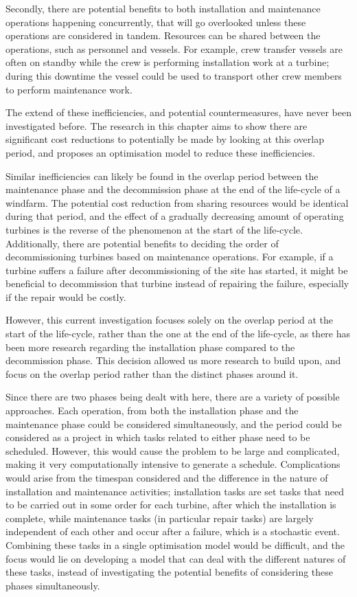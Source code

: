 \documentclass[a4paper,12pt]{report}
\begin{document}
Secondly, there are potential benefits to both installation and maintenance operations happening concurrently, that will go overlooked unless these operations are considered in tandem. Resources can be shared between the operations, such as personnel and vessels. For example, crew transfer vessels are often on standby while the crew is performing installation work at a turbine; during this downtime the vessel could be used to transport other crew members to perform maintenance work. 

The extend of these inefficiencies, and potential countermeasures, have never been investigated before. The research in this chapter aims to show there are significant cost reductions to potentially be made by looking at this overlap period, and proposes an optimisation model to reduce these inefficiencies. 

\bigskip

Similar inefficiencies can likely be found in the overlap period between the maintenance phase and the decommission phase at the end of the life-cycle of a windfarm. The potential cost reduction from sharing resources would be identical during that period, and the effect of a gradually decreasing amount of operating turbines is the reverse of the phenomenon at the start of the life-cycle. Additionally, there are potential benefits to deciding the order of decommissioning turbines based on maintenance operations. For example, if a turbine suffers a failure after decommissioning of the site has started, it might be beneficial to decommission that turbine instead of repairing the failure, especially if the repair would be costly. 

However, this current investigation focuses solely on the overlap period at the start of the life-cycle, rather than the one at the end of the life-cycle, as there has been more research regarding the installation phase compared to the decommission phase. This decision allowed us more research to build upon, and focus on the overlap period rather than the distinct phases around it. 

\bigskip

Since there are two phases being dealt with here, there are a variety of possible approaches. Each operation, from both the installation phase and the maintenance phase could be considered simultaneously, and the period could be considered as a project in which tasks related to either phase need to be scheduled. However, this would cause the problem to be large and complicated, making it very computationally intensive to generate a schedule. Complications would arise from the timespan considered and the difference in the nature of installation and maintenance activities; installation tasks are set tasks that need to be carried out in some order for each turbine, after which the installation is complete, while maintenance tasks (in particular repair tasks) are largely independent of each other and occur after a failure, which is a stochastic event. Combining these tasks in a single optimisation model would be difficult, and the focus would lie on developing a model that can deal with the different natures of these tasks, instead of investigating the potential benefits of considering these phases simultaneously.
\end{document}
